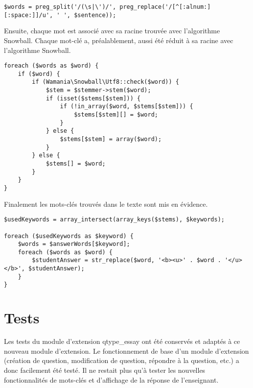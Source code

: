 
\begin{lstfloat}
\begin{lstlisting}[frame=l]
$words = preg_split('/(\s|\')/', preg_replace('/[^[:alnum:][:space:]]/u', ' ', $sentence));
\end{lstlisting}
\caption{Isoler les mots du texte.}
\label{code:isoler}
\end{lstfloat}

Ensuite, chaque mot est associé avec sa racine trouvée avec l'algorithme Snowball.
Chaque mot-clé a, préalablement, aussi été réduit à sa racine avec l'algorithme Snowball.

\begin{lstfloat}
\begin{lstlisting}[frame=l]
foreach ($words as $word) {
	if ($word) {
		if (Wamania\Snowball\Utf8::check($word)) {
			$stem = $stemmer->stem($word);
			if (isset($stems[$stem])) {
				if (!in_array($word, $stems[$stem])) {
					$stems[$stem][] = $word;
				}
			} else {
				$stems[$stem] = array($word);
			}
		} else {
			$stems[] = $word;
		}
	}
}
\end{lstlisting}
\caption{Racination des mots avec Snowball.}
\label{code:racinationsnowball}
\end{lstfloat}

Finalement les mots-clés trouvés dans le texte sont mis en évidence.

\begin{lstfloat}
\begin{lstlisting}[frame=l]
$usedKeywords = array_intersect(array_keys($stems), $keywords);

foreach ($usedKeywords as $keyword) {
	$words = $answerWords[$keyword];
	foreach ($words as $word) {
		$studentAnswer = str_replace($word, '<b><u>' . $word . '</u></b>', $studentAnswer);
	}
}
\end{lstlisting}
\caption{Mise en évidence des mots-clés trouvés.}
\label{code:mots-cles}
\end{lstfloat}

\section{Tests}

Les tests du module d'extension \og qtype\_essay \fg{} ont été conservés et adaptés à ce nouveau module d'extension.
Le fonctionnement de base d'un module d'extension (création de question, modification de question, répondre à la question, etc.) a donc facilement été testé.
Il ne restait plus qu'à tester les nouvelles fonctionnalités de mots-clés et d'affichage de la réponse de l'enseignant.

